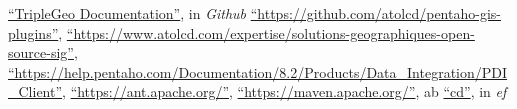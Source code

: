 \begin{thebibliography}{99}
        \href{https://github.com/oeg-upm/geo.linkeddata.es-TripleGeoKettle/wiki}{``TripleGeo Documentation''},
        in \textit{Github}
        \href{https://github.com/atolcd/pentaho-gis-plugins}{``https://github.com/atolcd/pentaho-gis-plugins''},
        \href{https://www.atolcd.com/expertise/solutions-geographiques-open-source-sig}{``https://www.atolcd.com/expertise/solutions-geographiques-open-source-sig''},
        \href{https://help.pentaho.com/Documentation/8.2/Products/Data\_Integration/PDI\_Client}{``https://help.pentaho.com/Documentation/8.2/Products/Data\_Integration/PDI\_Client''},
        \href{https://ant.apache.org/}{``https://ant.apache.org/''},
        \href{https://maven.apache.org/}{``https://maven.apache.org/''},
    ab
        \href{}{``cd''},
        in \textit{ef}



\end{thebibliography}
